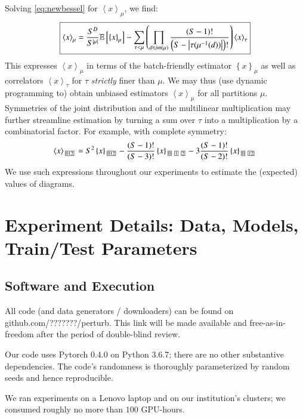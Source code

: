 \documentclass{article}
\theoremstyle{plain}
\theoremstyle{definition}
\newcommand{\wrap}[1]{\left(#1\right)}
\newcommand{\wang}[1]{\left\langle#1\right\rangle}
\newcommand{\wabs}[1]{\left|#1\right|}
\newcommand{\wurl}[1]{\left\{#1\right\}}
\newcommand{\partitionbox}[1]{
    \text{
        \fboxsep=0.5pt
        \tiny
        \fbox{#1}
    }
}
\newcommand{\expct}[1]{\mathbb{E}\left[#1\right]}
\begin{document}
    Solving \ref{eq:newbessel} for $\wang{x}_\mu$, we find:
    \begin{equation*}
        \text{\fbox{$
        \wang{x}_\mu
        =
        \frac{S^D}{S^{\wabs{\mu}}}
        \expct{
            \wurl{x}_\mu
        }
        -
        \sum_{\tau < \mu} \wrap{
            \prod_{d\in im(\mu)}
            \frac{\wrap{S-1}!}{\wrap{S-\wabs{\tau(\mu^{-1}(d))}}!}
        }
        \wang{x}_\tau
        $}}
    \end{equation*}
    This expresses $\wang{x}_\mu$ in terms of the batch-friendly estimator
    $\wurl{x}_\mu$ as well as correlators $\wang{x}_\tau$ for $\tau$ 
    \emph{strictly} finer than $\mu$.  We may thus (use dynamic programming to)
    obtain unbiased estimators $\wang{x}_\mu$ for all partitions $\mu$. 
    Symmetries of the joint distribution and of the multilinear multiplication
    may further streamline estimation by turning a sum over $\tau$ into a
    multiplication by a combinatorial factor.  For example, with complete
    symmetry:
    $$
        \wang{x}_{\partitionbox{012}}
        =
        S^2
        \wurl{x}_{\partitionbox{012}}
        -
        \frac{(S-1)!}{(S-3)!}
        \wurl{x}_{\partitionbox{0}\partitionbox{1}\partitionbox{2}}
        -
        3\frac{(S-1)!}{(S-2)!}
        \wurl{x}_{\partitionbox{0}\partitionbox{12}}
    $$
    We use such expressions throughout our experiments to estimate the
    (expected) values of diagrams.


\section{Experiment Details: Data, Models, Train/Test Parameters}\label{sect:landscape}
    \subsection{Software and Execution}
        All code (and data generators / downloaders) can be found on
        {\color{mooteal}github.com/???????/perturb}.  This link will be made
        available and free-as-in-freedom after the period of double-blind
        review.

        Our code uses Pytorch 0.4.0 on Python 3.6.7; there are no other
        substantive dependencies.  The code's randomness is thoroughly
        parameterized by random seeds and hence reproducible.

        We ran experiments on a Lenovo laptop and on our institution's
        clusters; we consumed roughly no more than $100$ GPU-hours.
\end{document}
